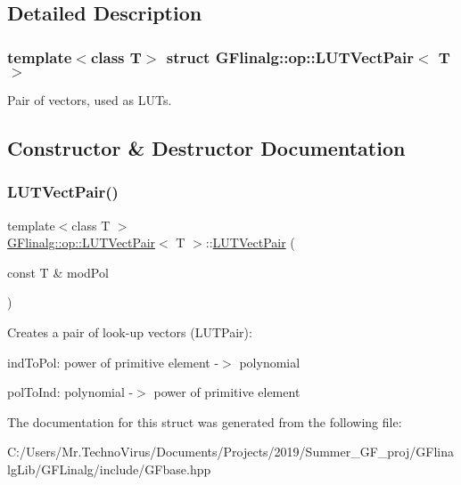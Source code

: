 \subsection{Detailed Description}
\subsubsection*{template$<$class T$>$\newline
struct G\+Flinalg\+::op\+::\+L\+U\+T\+Vect\+Pair$<$ T $>$}

Pair of vectors, used as L\+U\+Ts. 

\subsection{Constructor \& Destructor Documentation}
\mbox{\label{struct_g_flinalg_1_1op_1_1_l_u_t_vect_pair_aa64a1a5e5d701d8b612e8f0e190fcac4}} 
\subsubsection{\texorpdfstring{LUTVectPair()}{LUTVectPair()}}
{\footnotesize\ttfamily template$<$class T $>$ \\
\mbox{\hyperlink{struct_g_flinalg_1_1op_1_1_l_u_t_vect_pair}{G\+Flinalg\+::op\+::\+L\+U\+T\+Vect\+Pair}}$<$ T $>$\+::\mbox{\hyperlink{struct_g_flinalg_1_1op_1_1_l_u_t_vect_pair}{L\+U\+T\+Vect\+Pair}} (\begin{DoxyParamCaption}\item[{const T \&}]{mod\+Pol }\end{DoxyParamCaption})\hspace{0.3cm}{\ttfamily [inline]}}

Creates a pair of look-\/up vectors (L\+U\+T\+Pair)\+:
\begin{DoxyItemize}
\item ind\+To\+Pol\+: power of primitive element -\/$>$ polynomial
\item pol\+To\+Ind\+: polynomial -\/$>$ power of primitive element 
\end{DoxyItemize}

The documentation for this struct was generated from the following file\+:\begin{DoxyCompactItemize}
\item 
C\+:/\+Users/\+Mr.\+Techno\+Virus/\+Documents/\+Projects/2019/\+Summer\+\_\+\+G\+F\+\_\+proj/\+G\+Flinalg\+Lib/\+G\+F\+Linalg/include/G\+Fbase.\+hpp\end{DoxyCompactItemize}
